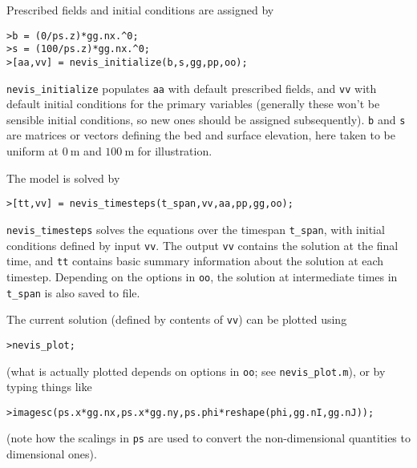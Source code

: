 \documentclass[a4paper,11pt,fleqn]{article}
\newcommand{\un}[1]{\ \textrm{#1}}
\begin{document}
{{%

Prescribed fields and initial conditions are assigned by
\begin{verbatim}
>b = (0/ps.z)*gg.nx.^0; 
>s = (100/ps.z)*gg.nx.^0;
>[aa,vv] = nevis_initialize(b,s,gg,pp,oo);
\end{verbatim}
\verb|nevis_initialize| populates \verb|aa| with default prescribed fields, and \verb|vv| with default initial conditions for the primary variables (generally these won't be sensible initial conditions, so new ones should be assigned subsequently).  \verb|b| and \verb|s| are matrices or vectors defining the bed and surface elevation, here taken to be uniform at $0\un{m}$ and $100\un{m}$ for illustration.

The model is solved by
\begin{verbatim}
>[tt,vv] = nevis_timesteps(t_span,vv,aa,pp,gg,oo);
\end{verbatim}
\verb|nevis_timesteps| solves the equations over the timespan \verb|t_span|, with initial conditions defined by input \verb|vv|. The output \verb|vv| contains the solution at the final time, and \verb|tt| contains basic summary information about the solution at each timestep.  Depending on the options in \verb|oo|, the solution at intermediate times in \verb|t_span| is also saved to file.

The current solution (defined by contents of \verb|vv|) can be plotted using
\begin{verbatim}
>nevis_plot;
\end{verbatim}
(what is actually plotted depends on options in \verb|oo|; see \verb|nevis_plot.m|), or by typing things like
\begin{verbatim}
>imagesc(ps.x*gg.nx,ps.x*gg.ny,ps.phi*reshape(phi,gg.nI,gg.nJ));
\end{verbatim}
(note how the scalings in \verb|ps| are used to convert the non-dimensional quantities to dimensional ones).

}}
\end{document}
